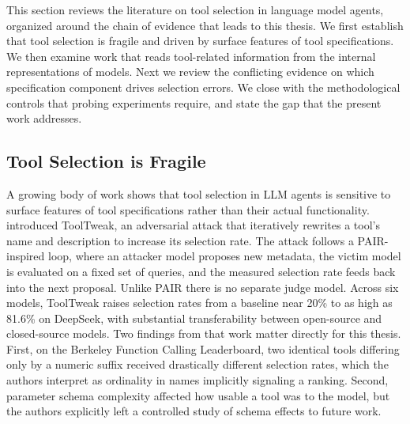 This section reviews the literature on tool selection in language model agents, organized around the chain of evidence that leads to this thesis.
We first establish that tool selection is fragile and driven by surface features of tool specifications.
We then examine work that reads tool-related information from the internal representations of models.
Next we review the conflicting evidence on which specification component drives selection errors.
We close with the methodological controls that probing experiments require, and state the gap that the present work addresses.

\subsection{Tool Selection is Fragile}

A growing body of work shows that tool selection in LLM agents is sensitive to surface features of tool specifications rather than their actual functionality.
\textcite{sneh2025tooltweak} introduced ToolTweak, an adversarial attack that iteratively rewrites a tool's name and description to increase its selection rate.
The attack follows a PAIR-inspired loop, where an attacker model proposes new metadata, the victim model is evaluated on a fixed set of queries, and the measured selection rate feeds back into the next proposal. Unlike PAIR there is no separate judge model.
Across six models, ToolTweak raises selection rates from a baseline near 20\% to as high as 81.6\% on DeepSeek, with substantial transferability between open-source and closed-source models.
Two findings from that work matter directly for this thesis.
First, on the Berkeley Function Calling Leaderboard, two identical tools differing only by a numeric suffix received drastically different selection rates, which the authors interpret as ordinality in names implicitly signaling a ranking.
Second, parameter schema complexity affected how usable a tool was to the model, but the authors explicitly left a controlled study of schema effects to future work.
\\

